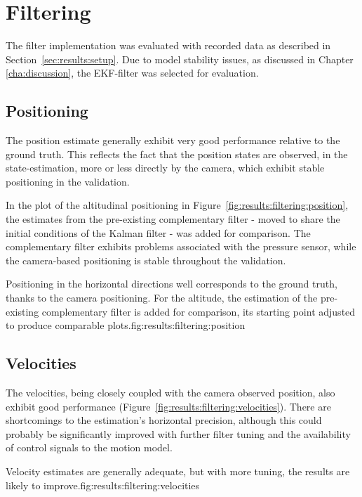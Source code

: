 \section{Filtering}
\label{sec:results:filtering}
The filter implementation was evaluated with recorded data as described in Section~\ref{sec:results:setup}.
Due to model stability issues, as discussed in Chapter \ref{cha:discussion},
the EKF-filter was selected for evaluation.

\subsection{Positioning}
    The position estimate generally exhibit very good performance relative
    to the ground truth.
    This reflects the fact that the position states are observed,
    in the state-estimation, more or less directly by the camera,
    which exhibit stable positioning in the validation.

    In the plot of the altitudinal positioning in Figure~\ref{fig:results:filtering:position},
    the estimates from the pre-existing complementary filter -
    moved to share the initial conditions of the Kalman filter - was added for
    comparison. The complementary filter exhibits problems associated
    with the pressure sensor, while the camera-based positioning is stable
    throughout the validation.

    \begin{subfigures}{Positioning in the horizontal directions well
    corresponds to the ground truth, thanks to the camera positioning.
    For the altitude, the estimation of the pre-existing complementary filter is added for comparison, its starting point adjusted to produce comparable plots.}{fig:results:filtering:position}
    \end{subfigures}

\subsection{Velocities}
    The velocities, being closely coupled with the camera observed position,
    also exhibit good performance (Figure~\ref{fig:results:filtering:velocities}).
    There are shortcomings to the estimation's horizontal precision, although
    this could probably be significantly improved with further filter tuning
    and the availability of control signals to the motion model.
    \begin{subfigures}{Velocity estimates are generally adequate, but with more tuning, the results are likely to improve.}{fig:results:filtering:velocities}
    \end{subfigures}

